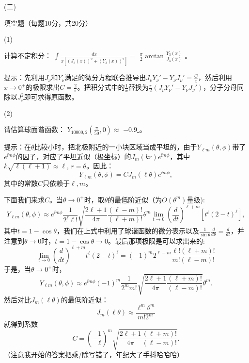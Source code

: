 \documentclass[12pt,CJK]{article}
\begin{document}
\item[(二)]{填空题（每题10分，共20分）
  \bitem
\item[(1)]{计算不定积分： $\int \frac{dx}{x\left[\left(J_3(x)\right)^2+\left(Y_3(x)\right)^2\right]} =  $ \underline{\blue $\frac{\pi}{2}\arctan{\frac{Y_3(x)}{J_3(x)}}$} 。

  {\red 提示：先利用$J_\nu$和$Y_\nu$满足的微分方程联合推导出$ J_\nu Y_\nu'-Y_\nu J_\nu'  = \frac{C}{x}$，然后利用$x\rightarrow 0^+$的极限求出$C = \frac{2}{\pi}$。把积分式中的$\frac{1}{x}$替换为$\frac{\pi}{2}\left(J_\nu Y_\nu'-Y_\nu J_\nu'\right)$，分子分母同除以$J_\nu^2$即可求得原函数。}
}
  \item[(2)]{请估算球面谐函数： $Y_{10000,2}\left(\frac{\pi}{50}, 0\right)\approx $ \underline{\blue $-0.9$ } 。

    {\red 提示：在$\theta$比较小时，把北极附近的一小块区域当成平坦的，由于$Y_{\ell m}(\theta,\phi)$带了$e^{\ii m\phi}$的因子，对应了平坦近似（极坐标）的$J_m(kr)e^{\ii m\phi}$，其中$k\sqrt{\ell(\ell+1)}\approx \ell$, $r=\theta$。因此：
      $$Y_{\ell m}(\theta,\phi) = C J_m(\ell \theta)e^{\ii m\phi},$$
      其中的常数$C$只依赖于$\ell,m$。

      下面我们来求$C$。当$\theta\rightarrow 0^+$时，取$\theta$的最低阶近似（为$O(\theta^m)$量级):
      $$ Y_{\ell m}(\theta,\phi) \approx e^{\ii m\phi} \frac{1}{2^\ell \ell!}\sqrt{ \frac{2\ell+1}{4\pi} \frac{(\ell-m)!}{(\ell+m)!}} \theta^m \lim_{t \rightarrow 0}\left(\frac{d}{dt}\right)^{\ell+m}\left[t^\ell (2-t)^\ell \right] , $$
        其中$t =1 -\cos\theta  $，我们在上式中利用了球谐函数的微分表示以及$\frac{1}{\sin\theta}\frac{d}{d\theta} = \frac{d}{dt}$，并注意到$\theta\rightarrow 0$时，$t=1-\cos\theta\rightarrow 0$。最后那项极限是可以求出来的:
        $$ \lim_{t \rightarrow 0}\left(\frac{d}{dt}\right)^{\ell+m}t^\ell (2-t)^\ell = (-1)^m 2^{\ell -m}\frac{\ell!(\ell+m)!}{m!(\ell-m)!} $$
        于是，当$\theta\rightarrow 0^+$时，
        $$ Y_{\ell m}(\theta,\phi)\approx e^{\ii m\phi} (-1)^m\frac{1}{ 2^mm!}\sqrt{ \frac{2\ell+1}{4\pi} \frac{(\ell+m)!}{(\ell-m)!}} \theta^m .$$
        然后对比$J_m(\ell\theta)$的最低阶近似：
        $$J_m(\ell\theta)\approx \frac{\ell^m\theta^m}{m!2^m} $$
        就得到系数
        $$ C = \left(-\frac{1}{\ell}\right)^m \sqrt{\frac{2\ell+1}{4\pi}\frac{(\ell+m)!}{(\ell-m)!}}. $$
        （注意我开始的答案把乘/除写错了，年纪大了手抖哈哈哈）


    }

  }
    
  \eitem
}
  
\end{document}
